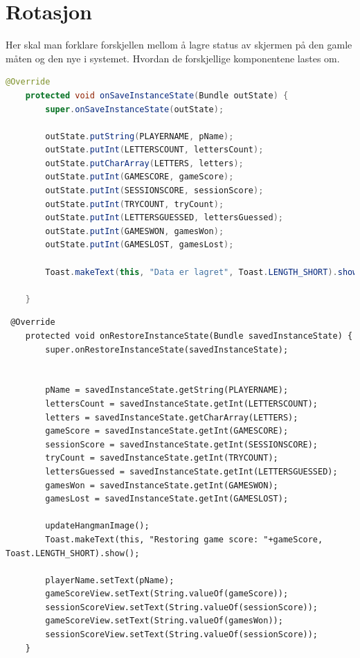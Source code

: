 \section{Rotasjon}
Her skal man forklare forskjellen mellom å lagre status av skjermen på den gamle måten og den nye i systemet. Hvordan de forskjellige komponentene lastes om. 
\begin{lstlisting}[language=Java]
    @Override
    protected void onSaveInstanceState(Bundle outState) {
        super.onSaveInstanceState(outState);

        outState.putString(PLAYERNAME, pName);
        outState.putInt(LETTERSCOUNT, lettersCount);
        outState.putCharArray(LETTERS, letters);
        outState.putInt(GAMESCORE, gameScore);
        outState.putInt(SESSIONSCORE, sessionScore);
        outState.putInt(TRYCOUNT, tryCount);
        outState.putInt(LETTERSGUESSED, lettersGuessed);
        outState.putInt(GAMESWON, gamesWon);
        outState.putInt(GAMESLOST, gamesLost);

        Toast.makeText(this, "Data er lagret", Toast.LENGTH_SHORT).show();

    }
\end{lstlisting}

\begin{lstlisting}
 @Override
    protected void onRestoreInstanceState(Bundle savedInstanceState) {
        super.onRestoreInstanceState(savedInstanceState);


        pName = savedInstanceState.getString(PLAYERNAME);
        lettersCount = savedInstanceState.getInt(LETTERSCOUNT);
        letters = savedInstanceState.getCharArray(LETTERS);
        gameScore = savedInstanceState.getInt(GAMESCORE);
        sessionScore = savedInstanceState.getInt(SESSIONSCORE);
        tryCount = savedInstanceState.getInt(TRYCOUNT);
        lettersGuessed = savedInstanceState.getInt(LETTERSGUESSED);
        gamesWon = savedInstanceState.getInt(GAMESWON);
        gamesLost = savedInstanceState.getInt(GAMESLOST);

        updateHangmanImage();
        Toast.makeText(this, "Restoring game score: "+gameScore, Toast.LENGTH_SHORT).show();

        playerName.setText(pName);
        gameScoreView.setText(String.valueOf(gameScore));
        sessionScoreView.setText(String.valueOf(sessionScore));
        gameScoreView.setText(String.valueOf(gamesWon));
        sessionScoreView.setText(String.valueOf(sessionScore));
    }
\end{lstlisting}


